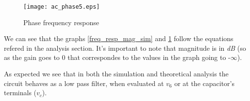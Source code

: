 \begin{figure}[H]
  \centering
  \texttt{[image: ac\_phase5.eps]}
  \caption{Phase frequency response}
  \label{freq_resp_pha_sim}
\end{figure}

We can see that the graphs \ref{freq_resp_mag_sim} and \ref{freq_resp_pha_sim} follow the equations refered in the analysis section. It's important to note that magnitude is in \emph{dB} (so as the gain goes to 0 that correspondes to the values in the graph going to -$\infty$).

As expected we see that in both the simulation and theoretical analysis the circuit behaves as a low pass filter, when evaluated at $v_6$ or at the capacitor's terminals ($v_c$).	
